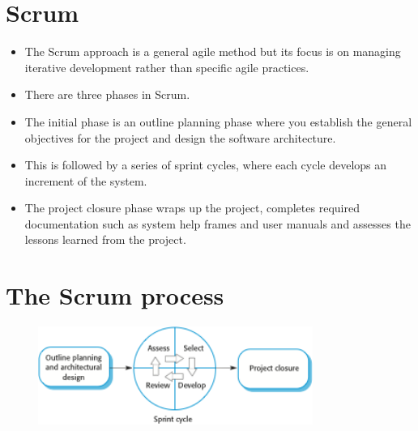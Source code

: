 \section{ Scrum}
\begin{itemize}

\item The Scrum approach is a general agile method but its focus is on managing iterative development rather than specific agile practices.

\item There are three phases in Scrum.

\item The initial phase is an outline planning phase where you establish the general objectives for the project and design the software architecture.
\item This is followed by a series of sprint cycles, where each cycle develops an increment of the system.
\item The project closure phase wraps up the project, completes required documentation such as system help frames and user manuals and assesses the lessons learned from the project.


\end{itemize}
\section{ The Scrum process}
\begin{figure}[h!]
    \centering
    \includegraphics[width = 0.8\textwidth]{./figures/L2_7.png}
    \caption{}
    \label{fig:L2_7}
\end{figure}

